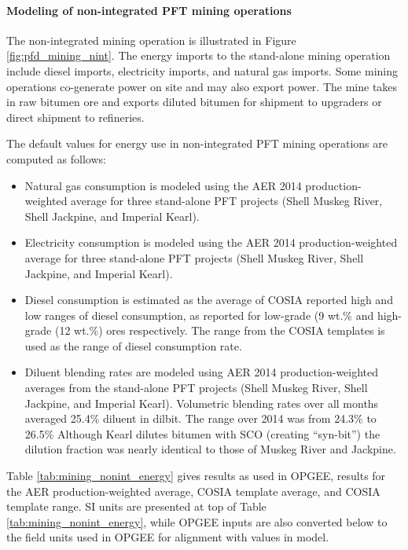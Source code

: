 \documentclass[11pt]{report}
\begin{document}
\paragraph{Modeling of non-integrated PFT mining operations}

The non-integrated mining operation is illustrated in Figure \ref{fig:pfd_mining_nint}.  The energy imports to the stand-alone mining operation include diesel imports, electricity imports, and natural gas imports. Some mining operations co-generate power on site and may also export power. The mine takes in raw bitumen ore and exports diluted bitumen for shipment to upgraders or direct shipment to refineries.

The default values for energy use in non-integrated PFT mining operations are computed as follows:
\begin{itemize}
\item Natural gas consumption is modeled using the AER 2014 production-weighted average for three stand-alone PFT projects (Shell Muskeg River, Shell Jackpine, and Imperial Kearl).
\item Electricity consumption is modeled using the AER 2014 production-weighted average for three stand-alone PFT projects (Shell Muskeg River, Shell Jackpine, and Imperial Kearl).
\item Diesel consumption is estimated as the average of COSIA reported high and low ranges of diesel consumption, as reported for low-grade (9 wt.\% and high-grade (12 wt.\%) ores respectively. The range from the COSIA templates is used as the range of diesel consumption rate.
\item Diluent blending rates are modeled using AER 2014 production-weighted averages from the stand-alone PFT projects (Shell Muskeg River, Shell Jackpine, and Imperial Kearl). Volumetric blending rates over all months averaged 25.4\% diluent in dilbit. The range over 2014 was from 24.3\% to 26.5\% Although Kearl dilutes bitumen with SCO (creating ``syn-bit'') the dilution fraction was nearly identical to those of Muskeg River and Jackpine.
\end{itemize}

Table \ref{tab:mining_nonint_energy} gives results as used in OPGEE, results for the AER production-weighted average, COSIA template average, and COSIA template range. SI units are presented at top of Table \ref{tab:mining_nonint_energy}, while OPGEE inputs are also converted below to the field units used in OPGEE for alignment with values in model.
\end{document}

